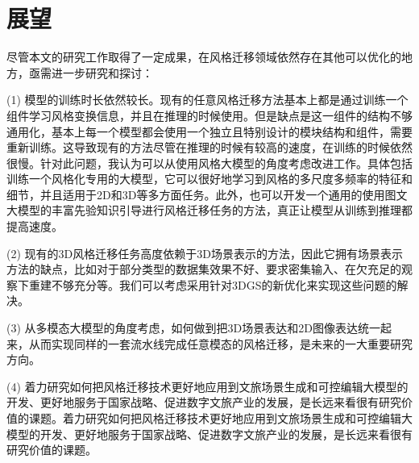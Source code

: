 \section{展望}
尽管本文的研究工作取得了一定成果，在风格迁移领域依然存在其他可以优化的地方，亟需进一步研究和探讨：
\par (1) 模型的训练时长依然较长。现有的任意风格迁移方法基本上都是通过训练一个组件学习风格变换信息，并且在推理的时候使用。但是缺点是这一组件的结构不够通用化，基本上每一个模型都会使用一个独立且特别设计的模块结构和组件，需要重新训练。这导致现有的方法尽管在推理的时候有较高的速度，在训练的时候依然很慢。针对此问题，我认为可以从使用风格大模型的角度考虑改进工作。具体包括训练一个风格化专用的大模型，它可以很好地学习到风格的多尺度多频率的特征和细节，并且适用于2D和3D等多方面任务。此外，也可以开发一个通用的使用图文大模型的丰富先验知识引导进行风格迁移任务的方法，真正让模型从训练到推理都提高速度。
\par (2) 现有的3D风格迁移任务高度依赖于3D场景表示的方法，因此它拥有场景表示方法的缺点，比如对于部分类型的数据集效果不好、要求密集输入、在欠充足的观察下重建不够充分等。我们可以考虑采用针对3DGS的新优化来实现这些问题的解决。
\par (3) 从多模态大模型的角度考虑，如何做到把3D场景表达和2D图像表达统一起来，从而实现同样的一套流水线完成任意模态的风格迁移，是未来的一大重要研究方向。
\par (4) 着力研究如何把风格迁移技术更好地应用到文旅场景生成和可控编辑大模型的开发、更好地服务于国家战略、促进数字文旅产业的发展，是长远来看很有研究价值的课题。着力研究如何把风格迁移技术更好地应用到文旅场景生成和可控编辑大模型的开发、更好地服务于国家战略、促进数字文旅产业的发展，是长远来看很有研究价值的课题。

